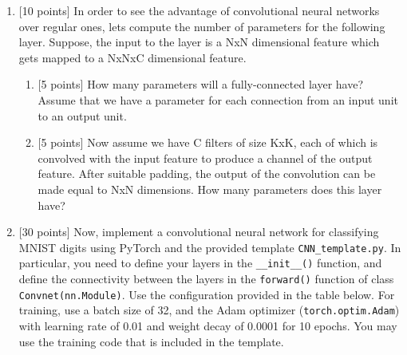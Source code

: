 \documentclass[letterpaper]{article}
\begin{document}
\begin{enumerate}

\item {[10 points]} In order to see the advantage of convolutional neural networks over regular ones, lets compute the number of parameters for the following layer. Suppose, the input to the layer is a NxN dimensional feature which gets mapped to a NxNxC dimensional feature.
    \begin{enumerate}
    
    \item {[5 points]} How many parameters will a fully-connected layer have? Assume that we have a parameter for each connection from an input unit to an output unit.
    
    \item {[5 points]} Now assume we have C filters of size KxK, each of which is convolved with the input feature to produce a channel of the output feature. After suitable padding, the output of the convolution can be made equal to NxN dimensions. How many parameters does this layer have?
    
    \end{enumerate}
    
    \item {[30 points]} Now, implement a convolutional neural network for classifying MNIST digits using PyTorch and the provided template \texttt{CNN\_template.py}. In particular, you need to define your layers in the \texttt{\_\_init\_\_()} function, and define the connectivity between the layers in the \texttt{forward()} function of class \texttt{Convnet(nn.Module)}. Use the configuration provided in the table below. For training, use a batch size of 32, and the Adam optimizer (\texttt{torch.optim.Adam}) with learning rate of 0.01 and weight decay of 0.0001 for 10 epochs. You may use the training code that is included in the template. 


\end{enumerate}
\end{document}
